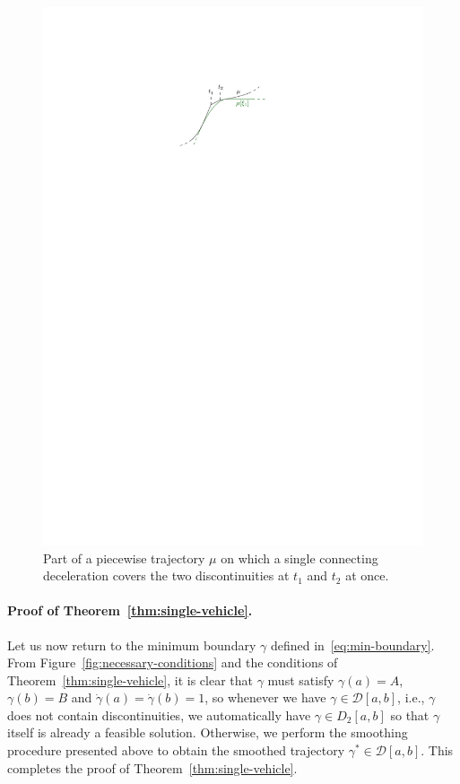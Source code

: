 \documentclass[a4paper]{report}
\theoremstyle{definition}
\theoremstyle{plain}
\begin{document}
\begin{figure}
  \centering
  \includegraphics[scale=1.0]{figures/motion/multiple-discontinuities}
  \caption{Part of a piecewise trajectory $\mu$ on which a single connecting
    deceleration covers the two discontinuities at $t_{1}$ and $t_{2}$ at
    once.}%
  \label{fig:multiple-discontinuities}
\end{figure}

\paragraph{Proof of Theorem~\ref{thm:single-vehicle}.}
Let us now return to the minimum boundary $\gamma$ defined
in~\eqref{eq:min-boundary}.
%
From Figure~\ref{fig:necessary-conditions} and the conditions of
Theorem~\ref{thm:single-vehicle}, it is clear that $\gamma$ must satisfy
$\gamma(a) = A$, $\gamma(b) = B$ and 
$\dot{\gamma}(a) = \dot{\gamma}(b) = 1$, so whenever we have
$\gamma \in \mathcal{D}[a, b]$, i.e., $\gamma$ does not contain discontinuities,
we automatically have $\gamma \in D_{2}[a,b]$ so that $\gamma$ itself is already
a feasible solution.
%
%
Otherwise, we perform the smoothing procedure presented above to obtain the
smoothed trajectory $\gamma^{*} \in \mathcal{D}[a,b]$.
%
This completes the proof of Theorem~\ref{thm:single-vehicle}.
\end{document}
